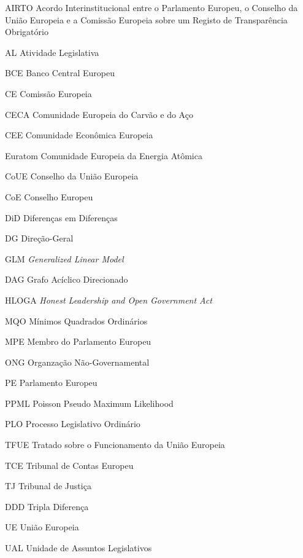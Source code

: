 \begin{siglas}
    \item[AIRTO] Acordo Interinstitucional entre o Parlamento Europeu, o Conselho da União Europeia e a Comissão Europeia sobre um Registo de Transparência Obrigatório
    \item[AL] Atividade Legislativa
    \item[BCE] Banco Central Europeu
    \item[CE] Comissão Europeia
    \item[CECA] Comunidade Europeia do Carvão e do Aço
    \item[CEE] Comunidade Econômica Europeia
    \item[Euratom] Comunidade Europeia da Energia Atômica
    \item[CoUE] Conselho da União Europeia
    \item[CoE] Conselho Europeu
    \item[DiD] Diferenças em Diferenças
    \item[DG] Direção-Geral
    \item[GLM] \textit{Generalized Linear Model}
    \item[DAG] Grafo Acíclico Direcionado
    \item[HLOGA] \textit{Honest Leadership and Open Government Act}
    \item[MQO] Mínimos Quadrados Ordinários
    \item[MPE] Membro do Parlamento Europeu
    \item[ONG] Organzação Não-Governamental
    \item[PE] Parlamento Europeu
    \item[PPML] Poisson Pseudo Maximum Likelihood
    \item[PLO] Processo Legislativo Ordinário
    \item[TFUE] Tratado sobre o Funcionamento da União Europeia
    \item[TCE] Tribunal de Contas Europeu
    \item[TJ] Tribunal de Justiça
    \item[DDD] Tripla Diferença
    \item[UE] União Europeia
    \item[UAL] Unidade de Assuntos Legislativos
\end{siglas}